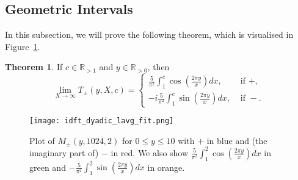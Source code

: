 \documentclass{amsart}
\theoremstyle{definition}
\newtheorem {theorem}{Theorem}[section]
\numberwithin{equation}{section}
\begin{document}
\subsection{Geometric Intervals}
In this subsection, we will prove the following theorem, which is visualised in Figure~\ref{fig:idft_dyadic_lavg}.
\begin{theorem}\label{thm.dyadic}
If $c\in\mathbb{R}_{>1}$ and $y\in\mathbb{R}_{>0}$, then
\begin{equation}\label{eq.int}
\lim_{X \to \infty} T_{\pm}(y,X,c) =
\begin{cases}
\frac{5}{\pi^2}\int_1^c \cos\left(\frac{2\pi y}{x} \right)dx, & \text{ if }+, \\
-i\frac{5}{\pi^2}\int_1^c \sin\left(\frac{2\pi y}{x} \right)dx, & \text{ if }-.
\end{cases}
\end{equation}
\end{theorem}

\begin{figure}[h]
\centering
\texttt{[image: idft\_dyadic\_lavg\_fit.png]}
\caption{\sf   Plot of $M_\pm(y, 1024, 2)$ for $0 \leq y \leq 10$ with $+$ in blue and (the imaginary part of) $-$ in red.  We also show $\frac{5}{\pi^2}\int_1^2 \cos \left(\frac{2\pi y}{x}\right)dx$ in green and $-\frac{5}{\pi^2}\int_1^2 \sin \left(\frac{2\pi y}{x}\right)dx$ in orange. }
\label{fig:idft_dyadic_lavg}
\end{figure}
\end{document}
